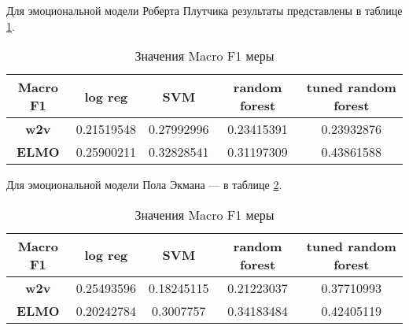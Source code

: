 \noindent
Для эмоциональной модели Роберта Плутчика результаты представлены в таблице \ref{tab:plutchik}.

\bigskip
\begin{table}[ht]
\caption{Значения Macro F1 меры}
\label{tab:plutchik}
\centering
\begin{tabular}{|c|c|c|c|c|}
\hline Macro F1 & \textbf{log reg} & \textbf{SVM} & \textbf{random forest} & \textbf{tuned random forest} \\
\hline \textbf{w2v} & 0.21519548 & 0.27992996 & 0.23415391 & 0.23932876 \\
\hline \textbf{ELMO} & 0.25900211 & 0.32828541 & 0.31197309 & 0.43861588 \\
\hline
\end{tabular}
\end{table}


\noindent
Для эмоциональной модели Пола Экмана --- в таблице \ref{tab:ekman}.


\bigskip
\begin{table}[ht]
\caption{Значения Macro F1 меры}
\label{tab:ekman}
\centering
\begin{tabular}{|c|c|c|c|c|}
\hline Macro F1 & \textbf{log reg} & \textbf{SVM} & \textbf{random forest} & \textbf{tuned random forest} \\
\hline \textbf{w2v} & 0.25493596 & 0.18245115 & 0.21223037 & 0.37710993 \\
\hline \textbf{ELMO}& 0.20242784 & 0.3007757 & 0.34183484 & 0.42405119 \\
\hline
\end{tabular}
\end{table}
